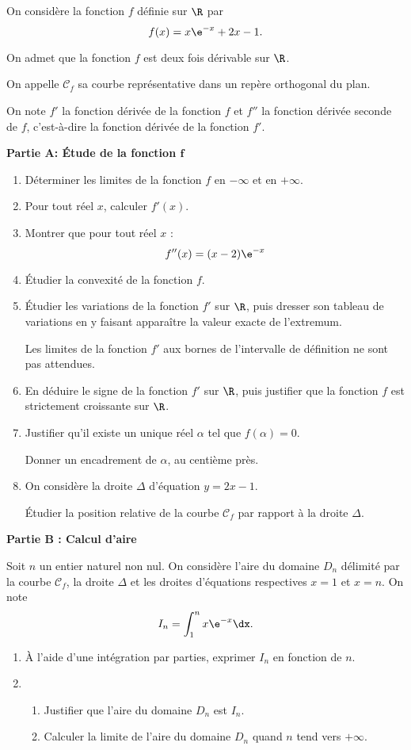 On considère la fonction $f$ définie sur $\R$ par \[f(x)=x \e^{-x}+2 x-1.\]

On admet que la fonction $f$ est deux fois dérivable sur $\R$.

On appelle $\mathcal{C}_{f}$ sa courbe représentative dans un repère orthogonal du plan.

On note $f'$ la fonction dérivée de la fonction $f$ et $f''$ la fonction dérivée seconde de $f$, c'est-à-dire la fonction dérivée de la fonction $f'$.

\medskip

\textbf{Partie A: Étude de la fonction $\bm{f}$}

\begin{enumerate}
	\item Déterminer les limites de la fonction $f$ en $-\infty$ et en $+\infty$.
	\item Pour tout réel $x$, calculer $f'(x)$.
	\item Montrer que pour tout réel $x$ : \[f''(x)= (x-2) \e^{-x}\]
	\item Étudier la convexité de la fonction $f$.
	\item Étudier les variations de la fonction $f'$ sur $\R$, puis dresser son tableau de variations en y faisant apparaître la valeur exacte de l'extremum.
	
	Les limites de la fonction $f'$ aux bornes de l'intervalle de définition ne sont pas attendues.
	
	\item En déduire le signe de la fonction $f'$ sur $\R$, puis justifier que la fonction $f$ est strictement croissante sur $\R$.
	\item Justifier qu'il existe un unique réel $\alpha$ tel que $f(\alpha)=0$.
	
	Donner un encadrement de $\alpha$, au centième près.
	\item On considère la droite $\Delta$ d'équation $y=2 x-1$.
	
	Étudier la position relative de la courbe $\mathcal{C}_{f}$ par rapport à la droite $\Delta$.
\end{enumerate}

\textbf{Partie B : Calcul d'aire}

\medskip

Soit $n$ un entier naturel non nul. On considère l'aire du domaine $D_{n}$ délimité par la courbe $\mathcal{C}_{f}$, la droite $\Delta$ et les droites d'équations respectives $x=1$ et $x=n$. On note \[ I_{n}=\int_{1}^{n} x \e^{-x} \dx.\]
%
\begin{enumerate}
	\item À l'aide d'une intégration par parties, exprimer $I_{n}$ en fonction de $n$.
	\item 
	\begin{enumerate}
		\item Justifier que l'aire du domaine $D_{n}$ est $I_{n}$.
		
		\item Calculer la limite de l'aire du domaine $D_{n}$ quand $n$ tend vers $+\infty$.
	\end{enumerate}
\end{enumerate}